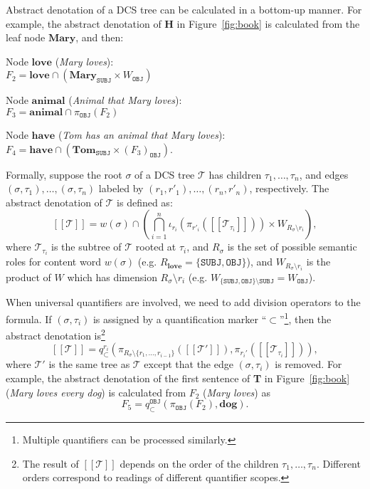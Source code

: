 \documentclass[11pt]{article}
\def\den#1{[\![#1]\!]}
\begin{document}
Abstract denotation of a DCS tree can be calculated in a bottom-up manner. 
For example, the abstract denotation of {\bf H} in Figure~\ref{fig:book} is 
calculated from the leaf node $\textbf{Mary}$, and then: 

\vspace{4pt}
\noindent Node $\textbf{love}$ (\emph{Mary loves}): \\
\indent\quad$F_2=\textbf{love}\cap(\textbf{Mary}_{\texttt{SUBJ}}\times W_{\texttt{OBJ}})$

\noindent Node $\textbf{animal}$ (\emph{Animal that Mary loves}): \\
\indent\quad$F_3=\textbf{animal}\cap\pi_{\texttt{OBJ}}(F_2)$

\noindent Node $\textbf{have}$ (\emph{Tom has an animal that Mary loves}): \\
\indent\quad$F_4=\textbf{have}\cap(\textbf{Tom}_{\texttt{SUBJ}}\times (F_{3})_{\texttt{OBJ}})$. 
\vspace{4pt}

\noindent Formally, suppose the root $\sigma$ of a DCS tree $\mathcal{T}$ has children
$\tau_1,\ldots,\tau_n$, and edges $(\sigma, \tau_1),\ldots,(\sigma, \tau_n)$
labeled by $(r_1, r'_1),\ldots,(r_n, r'_n)$, respectively. 
The abstract denotation of $\mathcal{T}$ is defined as:
$$
\den{\mathcal{T}}\!=\!
w(\sigma)\cap
(\bigcap_{i=1}^n \iota_{r_i}(\pi_{r'_i}(\den{\mathcal{T}_{\tau_i}}))
\times W_{R_{\sigma}\setminus r_i}),
$$
where $\mathcal{T}_{\tau_i}$ is the subtree of $\mathcal{T}$ rooted at
$\tau_i$, and $R_{\sigma}$ is the set of possible semantic roles for content word 
$w(\sigma)$ (e.g. $R_{\textbf{love}}=\{\texttt{SUBJ},\texttt{OBJ}\}$), 
and $W_{R_{\sigma}\setminus r_i}$ is the product of $W$ 
which has dimension $R_{\sigma}\setminus r_i$ (e.g. 
$W_{\{\texttt{SUBJ},\texttt{OBJ}\}\setminus\texttt{SUBJ}}=W_{\texttt{OBJ}}$). 

When universal quantifiers are involved, we need to add division operators 
to the formula. If $(\sigma,\tau_i)$ is assigned by a 
quantification marker ``$\subset$''\footnote{Multiple quantifiers
can be processed similarly.}, then the abstract denotation 
is\footnote{The result of $\den{\mathcal{T}}$ 
depends on the order of the children $\tau_1,\ldots,\tau_n$. Different orders 
correspond to readings of different quantifier scopes.} 
$$
\den{\mathcal{T}}\!=\!
q_{\subset}^{r_i}(\pi_{R_{\sigma}\setminus\{r_1,\ldots,r_{i-1}\}}(\den{\mathcal{T}'}),
\pi_{r_i'}(\den{\mathcal{T}_{\tau_i}})),
$$
where $\mathcal{T}'$ is the same tree as $\mathcal{T}$ except that 
the edge $(\sigma,\tau_i)$ is removed. For example, the abstract 
denotation of the first sentence of {\bf T} in Figure~\ref{fig:book} 
(\textit{Mary loves every dog}) is calculated from $F_2$ (\emph{Mary loves}) as 
$$
F_5=q_{\subset}^{\texttt{OBJ}}(\pi_{\texttt{OBJ}}(F_2), \textbf{dog}). 
$$
\end{document}

